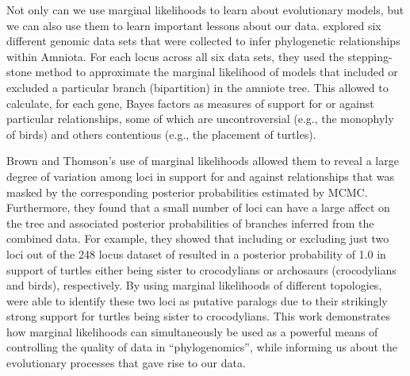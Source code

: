 Not only can we use marginal likelihoods to learn about evolutionary models,
but we can also use them to learn important lessons about our data.
\citet{Brown2017} explored six different genomic data sets
that were collected to infer phylogenetic relationships within Amniota.
For each locus across all six data sets, they used the stepping-stone method
\citep{Xie2011} to approximate the marginal likelihood of models that included
or excluded a particular branch (bipartition) in the amniote tree.
This allowed \citet{Brown2017} to calculate, for each
gene, Bayes factors as measures of support for or against particular
relationships, some of which are uncontroversial (e.g., the monophyly of birds)
and others contentious (e.g., the placement of turtles).


Brown and Thomson's \citeyear{Brown2017} use of marginal likelihoods allowed
them to reveal a large degree of variation among loci in
support for and against relationships that was masked by the corresponding
posterior probabilities estimated by MCMC.
Furthermore, they found that a small number of loci can have a large affect on
the tree and associated posterior probabilities of branches inferred from the
combined data.
For example, they showed that including or excluding just two loci out of the
248 locus dataset of \citep{Chiari2012} resulted in a posterior probability of
1.0 in support of turtles either being sister to crocodylians or archosaurs
(crocodylians and birds), respectively.
By using marginal likelihoods of different topologies,
\citet{Brown2017} were able to identify these two loci as putative paralogs
due to their strikingly strong support for turtles being sister to
crocodylians.
This work demonstrates how marginal likelihoods can simultaneously be used as a
powerful means of controlling the quality of data in ``phylogenomics'', while
informing us about the evolutionary processes that gave rise to our data.

